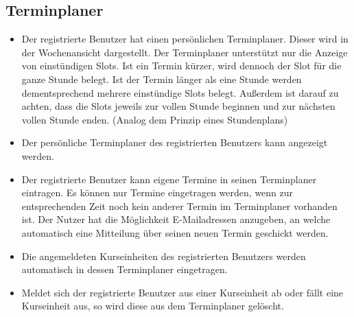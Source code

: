 \documentclass[a4paper]{scrreprt}
\begin{document}
		\subsection{Terminplaner}
			\begin{itemize}
				\item {}
					Der registrierte Benutzer hat einen persönlichen Terminplaner. Dieser wird in der Wochenansicht dargestellt. Der Terminplaner unterstützt nur die Anzeige von einstündigen Slots. Ist ein Termin kürzer, wird dennoch der Slot für die ganze Stunde belegt. Ist der Termin länger als eine Stunde werden dementsprechend mehrere einstündige Slots belegt.
					Außerdem ist darauf zu achten, dass die Slots jeweils zur vollen Stunde beginnen und zur nächsten vollen Stunde enden. (Analog dem Prinzip eines Stundenplans)
				\item {}
					Der persönliche Terminplaner des registrierten Benutzers kann angezeigt werden. 
				\item {} 
					Der registrierte Benutzer kann eigene Termine in seinen Terminplaner eintragen. Es können nur Termine eingetragen werden, wenn zur entsprechenden Zeit noch kein anderer Termin im Terminplaner vorhanden ist. Der Nutzer hat die Möglichkeit E-Mailadressen anzugeben, an welche automatisch eine Mitteilung über seinen neuen Termin geschickt werden.
				\item {}
					Die angemeldeten Kurseinheiten des registrierten Benutzers werden automatisch in dessen Terminplaner eingetragen.
				\item {}	
					Meldet sich der registrierte Benutzer aus einer Kurseinheit ab oder fällt eine Kurseinheit aus, so wird diese aus dem Terminplaner gelöscht.
			\end{itemize}   
\end{document}
